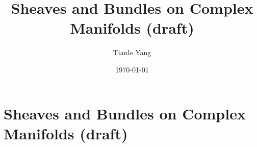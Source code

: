 \documentclass{noteformyself}
\title{Sheaves and Bundles on Complex Manifolds (draft)}
\author{Tianle Yang}
\date{\today}
\begin{document}
    \maketitle
    \section{Sheaves and Bundles on Complex Manifolds (draft)}




\end{document}

